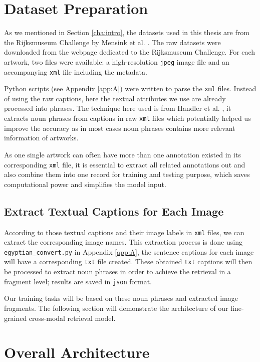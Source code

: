 \section{Dataset Preparation}
\label{sec:dataprep}
As we mentioned in Section \ref{cha:intro}, the datasets used in this thesis are from the Rijksmuseum Challenge by Mensink et al. \cite{MensinkICMIR2014}. The raw datasets were downloaded from the webpage dedicated to the Rijksmuseum Challenge. For each artwork, two files were available: a high-resolution \verb|jpeg| image file and an accompanying \verb|xml| file including the metadata.

Python scripts (see Appendix \ref{app:A}) were written to parse the \verb|xml| files. Instead of using the raw captions, here the textual attributes we use are already processed into phrases. The technique here used is from Handler et al. \cite{nounphrase}, it extracts noun phrases from captions in raw \verb|xml| files which potentially helped us improve the accuracy as in most cases noun phrases contains more relevant information of artworks.  

As one single artwork can often have more than one annotation existed in its corresponding \verb|xml| file, it is essential to extract all related annotations out and also combine them into one record for training and testing purpose, which saves computational power and simplifies the model input. 

\subsection{Extract Textual Captions for Each Image}

According to those textual captions and their image labels in \verb|xml| files, we can extract the corresponding image names. This extraction process is done using \verb|egyptian_convert.py| in Appendix \ref{app:A}, the sentence captions for each image will have a corresponding \verb|txt| file created. These obtained \verb|txt| captions will then be processed to extract noun phrases in order to achieve the retrieval in a fragment level; results are saved in \verb|json| format. 

Our training tasks will be based on these noun phrases and extracted image fragments. The following section will demonstrate the architecture of our fine-grained cross-modal retrieval model.

\section{Overall Architecture}

